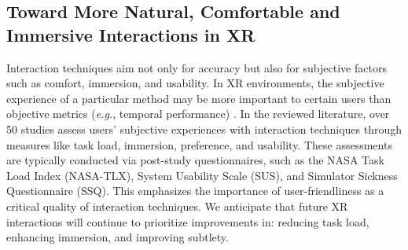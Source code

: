 \documentclass[review]{fcs}
\begin{document}
\subsection{Toward More Natural, Comfortable and Immersive Interactions in XR}
\label{4.2}
Interaction techniques aim not only for accuracy but also for subjective factors such as comfort, immersion, and usability. In XR environments, the subjective experience of a particular method may be more important to certain users than objective metrics (\textit{e.g.}, temporal performance) \cite{DBLP:conf/vr/HombeckVHDL23}. In the reviewed literature, over 50 studies assess users' subjective experiences with interaction techniques through measures like task load, immersion, preference, and usability. These assessments are typically conducted via post-study questionnaires, such as the NASA Task Load Index (NASA-TLX), System Usability Scale (SUS), and Simulator Sickness Questionnaire (SSQ). This emphasizes the importance of user-friendliness as a critical quality of interaction techniques. We anticipate that future XR interactions will continue to prioritize improvements in: reducing task load, enhancing immersion, and improving subtlety.
\end{document}
